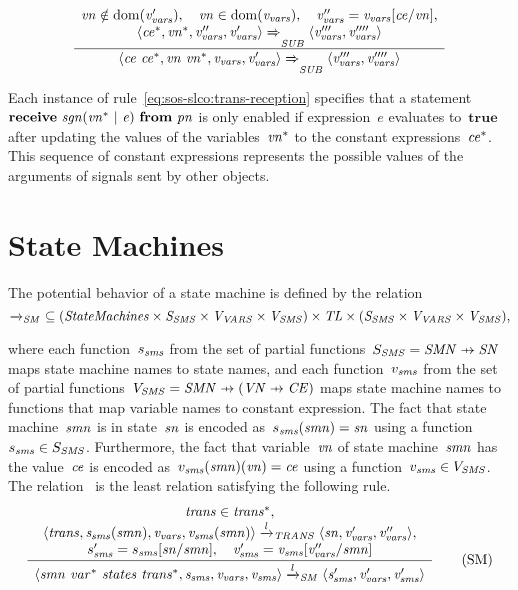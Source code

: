 \begin{equation*}
 \frac{ \begin{array}[c]{c} 
\it{vn} \notin \operatorname{dom}(v_{\it{vars}}'), \quad
\it{vn} \in \operatorname{dom}(v_{\it{vars}}), \quad
v_{\it{vars}}'' = v_{\it{vars}}[\it{ce}/\it{vn}], \\
\langle \it{ce^*}, \it{vn^*}, v_{\it{vars}}'', v_{\it{vars}}' \rangle
\xRightarrow{\it{}}_{\it{SUB}}
\langle v_{\it{vars}}''', v_{\it{vars}}'''' \rangle
 \end{array} }{ \begin{array}[c]{c} 
\langle \it{ce}~\it{ce^*}, \it{vn}~\it{vn^*}, v_{\it{vars}}, v_{\it{vars}}' \rangle
\xRightarrow{\it{}}_{\it{SUB}}
\langle v_{\it{vars}}''', v_{\it{vars}}'''' \rangle
 \end{array} } 
\end{equation*}

\noindent
Each instance of rule~\eqref{eq:sos-slco:trans-reception} specifies that a statement~$\textbf{receive}~\it{sgn}(\it{vn^*}~|~\it{e})~\textbf{from}~\it{pn}$ is only enabled if expression~$e$ evaluates to~$\textbf{true}$ after updating the values of the variables~$\it{vn^*}$ to the constant expressions~$\it{ce^*}$.
This sequence of constant expressions represents the possible values of the arguments of signals sent by other objects.

\section{State Machines}
The potential behavior of a state machine is defined by the relation
%
\[
\xrightarrow{\it{}}_{\it{SM}} ~ \subseteq (\it StateMachines \times S_{\it{SMS}} \times V_{\it{VARS}} \times V_{\it{SMS}}) \times \it TL \times (S_{\it{SMS}} \times V_{\it{VARS}} \times V_{\it{SMS}}),
\]

\noindent
where each function~$s_{\it{sms}}$ from the set of partial functions~$\SSMS = \StateMachineNames \pfun \StateNames$ maps state machine names to state names, and each function~$v_{\it{sms}}$ from the set of partial functions~$\VSMS = \StateMachineNames \pfun (\VariableNames \pfun \ConstantExpressions)$ maps state machine names to functions that map variable names to constant expression.
The fact that state machine~$\it{smn}$ is in state~$\it{sn}$ is encoded as~$s_{\it{sms}}(\it{smn}) = \it{sn}$ using a function~$s_{\it{sms}} \in S_{\it{SMS}}$.
Furthermore, the fact that variable~$\it{vn}$ of state machine~$\it{smn}$ has the value~$\it{ce}$ is encoded as~$v_{\it{sms}}(\it{smn})(\it{vn}) = \it{ce}$ using a function~$v_{\it{sms}} \in V_{\it{SMS}}$.
The relation~\StateMachineRelation{} is the least relation satisfying the following rule.
%
\begin{equation*}
 \frac{ \begin{array}[c]{c} 
\it{trans} \in \it{trans^*}, \\
\langle \it{trans}, s_{\it{sms}}(\it{smn}), v_{\it{vars}}, v_{\it{sms}}(\it{smn}) \rangle
\xrightarrow{\it{l}}_{\it{TRANS}}
\langle \it{sn}, v_{\it{vars}}', v_{\it{vars}}'' \rangle, \\
s_{\it{sms}}' = s_{\it{sms}}[\it{sn}/\it{smn}], \quad
v_{\it{sms}}' = v_{\it{sms}}[v_{\it{vars}}''/\it{smn}]
 \end{array} }{ \begin{array}[c]{c} 
\langle \it{smn}~\it{var^*}~\it{states}~\it{trans^*}, s_{\it{sms}}, v_{\it{vars}}, v_{\it{sms}} \rangle
\xrightarrow{\it{l}}_{\it{SM}}
\langle s_{\it{sms}}', v_{\it{vars}}', v_{\it{sms}}' \rangle
 \end{array} } 
\tag{SM}
\label{eq:sos-slco:sm}
\end{equation*}

